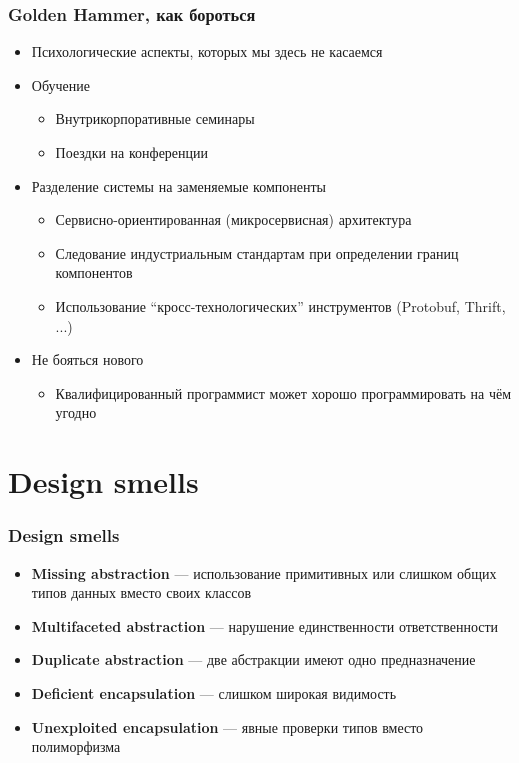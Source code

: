 \documentclass[xetex,mathserif,serif]{beamer}
\begin{document}
	\begin{frame}
		\frametitle{Golden Hammer, как бороться}
		\begin{itemize}
			\item Психологические аспекты, которых мы здесь не касаемся
			\item Обучение
			\begin{itemize}
				\item Внутрикорпоративные семинары
				\item Поездки на конференции
			\end{itemize}
			\item Разделение системы на заменяемые компоненты
			\begin{itemize}
				\item Сервисно-ориентированная (микросервисная) архитектура
				\item Следование индустриальным стандартам при определении границ компонентов
				\item Использование ``кросс-технологических'' инструментов (Protobuf, Thrift, ...)
			\end{itemize}
			\item Не бояться нового
			\begin{itemize}
				\item Квалифицированный программист может хорошо программировать на чём угодно
			\end{itemize}
		\end{itemize}
	\end{frame}

	\section{Design smells}

	\begin{frame}
		\frametitle{Design smells}
		\begin{itemize}
			\item \textbf{Missing abstraction} --- использование примитивных или слишком общих типов данных вместо своих классов
			\item \textbf{Multifaceted abstraction} --- нарушение единственности ответственности
			\item \textbf{Duplicate abstraction} --- две абстракции имеют одно предназначение
			\item \textbf{Deficient encapsulation} --- слишком широкая видимость
			\item \textbf{Unexploited encapsulation} --- явные проверки типов вместо полиморфизма
		\end{itemize}
	\end{frame}
\end{document}
